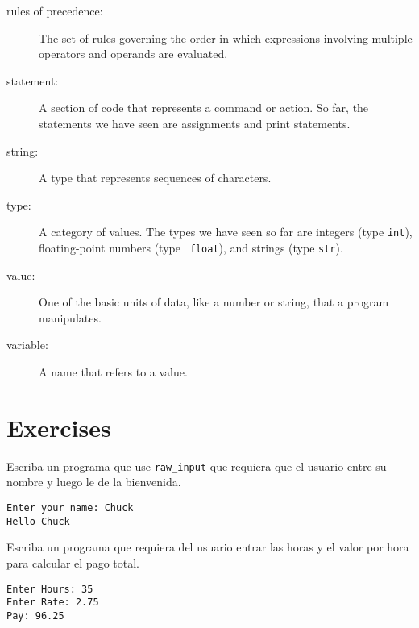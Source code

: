 \begin{ex}
\begin{description}
\item[rules of precedence:]  The set of rules governing the order in which
expressions involving multiple operators and operands are evaluated.

\item[statement:]  A section of code that represents a command or action.  So
far, the statements we have seen are assignments and print statements.

\item[string:] A type that represents sequences of characters.

\item[type:] A category of values.  The types we have seen so far
are integers (type {\tt int}), floating-point numbers (type {\tt
float}), and strings (type {\tt str}).

\item[value:]  One of the basic units of data, like a number or string, 
that a program manipulates.

\item[variable:]  A name that refers to a value.


\end{description}

\section{Exercises}

\begin{ex}

Escriba un programa que use \verb"raw_input" que requiera que el usuario entre su nombre y luego le de la bienvenida.



\begin{verbatim}
Enter your name: Chuck
Hello Chuck
\end{verbatim}

\end{ex}

\begin{ex}

Escriba un programa que requiera del usuario entrar las horas y el valor por hora para calcular el pago total.


\begin{verbatim}
Enter Hours: 35
Enter Rate: 2.75
Pay: 96.25
\end{verbatim}
\end{ex}
%


\end{ex}
